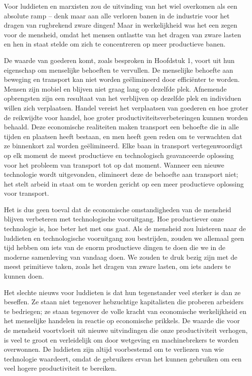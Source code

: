 Voor luddieten en marxisten zou de uitvinding van het wiel overkomen als een absolute ramp -- denk maar aan alle verloren banen in de industrie voor het dragen van rugbrekend zware dingen! Maar in werkelijkheid was het een zegen voor de mensheid, omdat het mensen ontlastte van het dragen van zware lasten en hen in staat stelde om zich te concentreren op meer productieve banen.

De waarde van goederen komt, zoals besproken in Hoofdstuk 1, voort uit hun eigenschap om menselijke behoeften te vervullen. De menselijke behoefte aan beweging en transport kan niet worden geëlimineerd door efficiënter te worden. Mensen zijn mobiel en blijven niet graag lang op dezelfde plek. Afnemende opbrengsten zijn een resultaat van het verblijven op dezelfde plek en individuen willen zich verplaatsen. Handel vereist het verplaatsen van goederen en hoe groter de reikwijdte voor handel, hoe groter productiviteitsverbeteringen kunnen worden behaald. Deze economische realiteiten maken transport een behoefte die in alle tijden en plaatsen heeft bestaan, en men heeft geen reden om te verwachten dat ze binnenkort zal worden geëlimineerd. Elke baan in transport vertegenwoordigt op elk moment de meest productieve en technologisch geavanceerde oplossing voor het probleem van transport tot op dat moment. Wanneer een nieuwe technologie wordt uitgevonden, elimineert deze de behoefte aan transport niet; het stelt arbeid in staat om te worden gericht op een meer productieve oplossing voor transport.

Het is dus geen toeval dat de economische omstandigheden van de mensheid blijven verbeteren met technologische vooruitgang. Hoe productiever onze technologie is, hoe beter het met ons gaat. Als de mensheid zou luisteren naar de luddieten en technologische vooruitgang zou bestrijden, zouden we allemaal geen tijd hebben om iets van de enorm productieve dingen te doen die we in de moderne samenleving van vandaag doen. We zouden te druk bezig zijn met de meest primitieve taken, zoals het dragen van zware lasten, om iets anders te kunnen doen.

Het slechte nieuws voor luddieten is dat hun tegenstander veel sterker is dan ze beseffen. Ze staan niet tegenover hebzuchtige kapitalisten die proberen arbeiders te bedriegen; ze staan tegenover de volle kracht van economische werkelijkheid en het menselijke handelen in reactie op economische prikkels. De waarde die voor de mensheid voortvloeit uit nieuwe uitvindingen die onze productiviteit verhogen, is veel te groot en verleidelijk om door wetgeving en machinebrekers te worden overwonnen. De luddieten zijn altijd voorbestemd om te verliezen van wie technologie waardeert, omdat de gebruikers ervan het kunnen gebruiken om een veel hogere productiviteit te bereiken.

